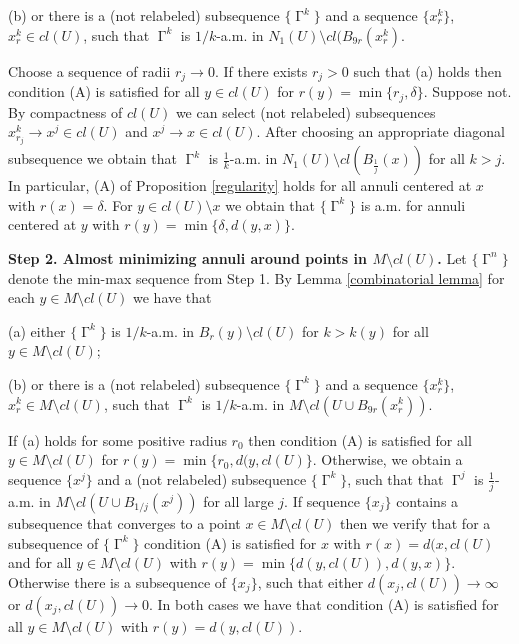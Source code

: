 \documentclass[12pt]{amsart}
\DeclareMathOperator{\G}{\Gamma}
\theoremstyle{definition}
\begin{document}
(b) or there is a (not relabeled) subsequence $\{ \G^k \}$ and a sequence
$\{ x^k_r \}$, $x^k_r \in cl(U)$, such that $ \G^k $ is 
$1/k$-a.m. in
$N_{1}(U) \setminus cl(B_{9r}(x^k_r)$.

Choose a sequence of radii $r_j \rightarrow 0$.  
If there exists $r_j>0$ such that (a) holds then 
condition (A) is satisfied for all $y \in cl(U)$ for
$r(y) = \min \{r_j,\delta \}$.
Suppose not. 
By compactness of $cl(U)$ we can select (not relabeled) subsequences
$x^k_{r_j} \rightarrow x^j \in cl(U)$
and $x^j \rightarrow x \in cl(U)$.
After choosing an appropriate diagonal subsequence we obtain
that $\G^k$ is $\frac{1}{k}$-a.m. in $N_{1}(U) \setminus cl(B_{\frac{1}{j}}(x))$
for all $k>j$. In particular, (A) of Proposition \ref*{regularity}
holds for all annuli centered at $x$ with $r(x)=\delta$.
For $y \in cl(U) \setminus x$ we obtain that $\{ \G^k \}$ is a.m. 
for annuli centered at $y$ with $r(y)= \min \{\delta, d(y,x) \}$. 



\vspace{3mm}

\textbf{Step 2. Almost minimizing annuli around points in 
$M \setminus cl(U)$.}
Let $\{ \G^n \}$ denote the min-max sequence from Step 1.
By Lemma \ref*{combinatorial lemma} for each $y \in M \setminus cl(U)$
we have that 

(a) either $\{ \G^k \}$ is $1/k$-a.m. in $B_r(y) \setminus cl(U)$ for $k>k(y)$ for all $y \in M \setminus cl(U)$;

(b) or there is a (not relabeled) subsequence $\{ \G^k \}$ and a sequence
$\{ x^k_r \}$, $x^k_r \in M \setminus cl(U)$, such that $ \G^k $ is 
$1/k$-a.m. in
$M \setminus cl(U \cup B_{9r}(x^k_r))$.

If (a) holds for some positive radius $r_0$ then condition (A) is satisfied
for all $y \in M \setminus cl(U)$ for $r(y) = \min \{r_0, d(y, cl(U) \}$.
Otherwise, we obtain a sequence $\{ x^j \}$ and a (not relabeled) subsequence
$\{ \G^k \}$, such that
that $\G^j$ is $\frac{1}{j}$-a.m. in $M \setminus cl(U \cup B_{1/j}(x^j))$
for all large $j$. If sequence $\{ x_j \}$ contains a subsequence that converges to a point
$x \in M \setminus cl(U)$ then we verify that for a subsequence of $\{ \G^k \}$ condition (A) is
satisfied for $x$ with $r(x) = d(x,cl(U)$ and for all $y \in M \setminus cl(U)$ with $r(y) = \min \{ d(y,cl(U)), d(y,x) \}$.
Otherwise there is a subsequence of $\{ x_j \}$, such that either $d(x_j, cl(U)) \rightarrow \infty$
or $d(x_j, cl(U)) \rightarrow 0$. In both cases we have that 
condition (A) is
satisfied for all $y \in M \setminus cl(U)$ with $r(y) = d(y,cl(U))$.
\end{document}
